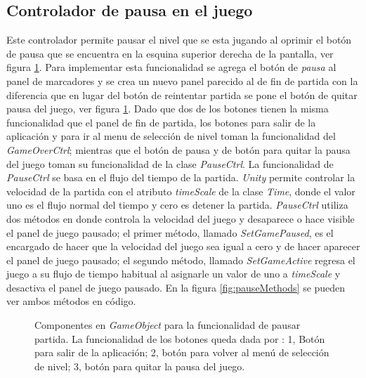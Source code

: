\subsection{Controlador de pausa en el juego}
Este controlador permite pausar el nivel que se esta jugando al oprimir el botón 
de pausa que se encuentra en la esquina superior derecha de la pantalla, ver 
figura \ref{fig:PausedFuctionality}. Para implementar esta funcionalidad se 
agrega el botón de \textit{pausa} al panel de marcadores y se crea un nuevo 
panel parecido al de fin de partida con la diferencia que en lugar del botón de 
reintentar partida se pone el botón de quitar pausa del juego, ver figura 
\ref{fig:PausedFuctionality}. Dado que dos de los botones tienen la misma 
funcionalidad que el panel de fin de partida, los botones para salir de la 
aplicación y para ir al menu de selección de nivel toman la funcionalidad del 
\textit{GameOverCtrl}; mientras que el botón de pausa y de botón para quitar la 
pausa del juego toman su funcionalidad de la clase \textit{PauseCtrl}. La 
funcionalidad de \textit{PauseCtrl} se basa en el flujo del tiempo de la 
partida. \textit{Unity} permite controlar la velocidad de la partida con el 
atributo \textit{timeScale} de la clase \textit{Time}, donde el valor uno es el 
flujo normal del tiempo y cero es detener la partida. \textit{PauseCtrl} utiliza 
dos métodos en donde controla la velocidad del juego y desaparece o hace visible 
el panel de juego pausado; el primer método, llamado \textit{SetGamePaused}, es 
el encargado de hacer que la velocidad del juego sea igual a cero y de hacer 
aparecer el panel de juego pausado; el segundo método, llamado 
\textit{SetGameActive} regresa el juego a su flujo de tiempo habitual al 
asignarle un valor de uno a \textit{timeScale} y desactiva el panel de juego 
pausado. En la figura \ref{fig:pauseMethods} se pueden ver ambos métodos en 
código. 

\begin{figure}
  \centering
   
 	

  \caption{Componentes en \textit{GameObject} para la funcionalidad de pausar 
  partida. La funcionalidad de los botones queda dada por : 1, Botón para salir 
  de la aplicación; 2, botón para volver al menú de selección de nivel; 3, botón 
  para quitar la pausa del juego. }
  \label{fig:PausedFuctionality}
\end{figure} 

